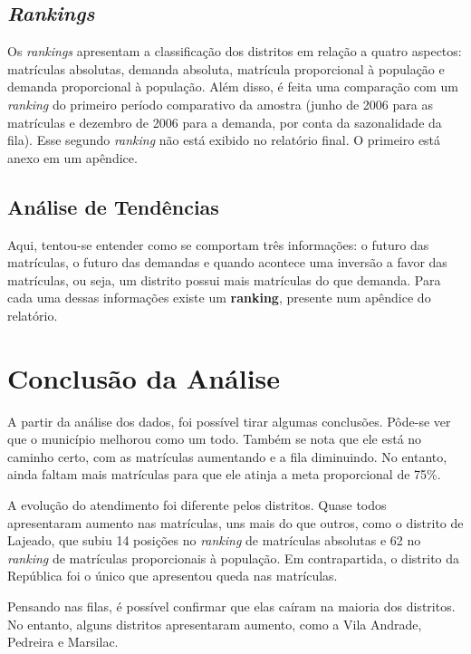 \documentclass[12pt, a4paper]{article}
\begin{document}
\subsection{\textit{Rankings}}

Os \textit{rankings} apresentam a classificação dos distritos em relação a quatro aspectos: matrículas absolutas, demanda absoluta, matrícula proporcional à população e demanda proporcional à população. Além disso, é feita uma comparação com um \textit{ranking} do primeiro período comparativo da amostra (junho de 2006 para as matrículas e dezembro de 2006 para a demanda, por conta da sazonalidade da fila). Esse segundo \textit{ranking} não está exibido no relatório final. O primeiro está anexo em um apêndice.  

\subsection{Análise de Tendências}

Aqui, tentou-se entender como se comportam três informações: o futuro das matrículas, o futuro das demandas e quando acontece uma inversão a favor das matrículas, ou seja, um distrito possui mais matrículas do que demanda. Para cada uma dessas informações existe um \textbf{ranking}, presente num apêndice do relatório.

\section{Conclusão da Análise}

A partir da análise dos dados, foi possível tirar algumas conclusões. Pôde-se ver que o município melhorou como um todo. Também se nota que ele está no caminho certo, com as matrículas aumentando e a fila diminuindo. No entanto, ainda faltam mais matrículas para que ele atinja a meta proporcional de 75\%.

A evolução do atendimento foi diferente pelos distritos. Quase todos apresentaram aumento nas matrículas, uns mais do que outros, como o distrito de Lajeado, que subiu 14 posições no \textit{ranking} de matrículas absolutas e 62 no \textit{ranking} de matrículas proporcionais à população. Em contrapartida, o distrito da República foi o único que apresentou queda nas matrículas.

Pensando nas filas, é possível confirmar que elas caíram na maioria dos distritos. No entanto, alguns distritos apresentaram aumento, como a Vila Andrade, Pedreira e Marsilac.
\end{document}
